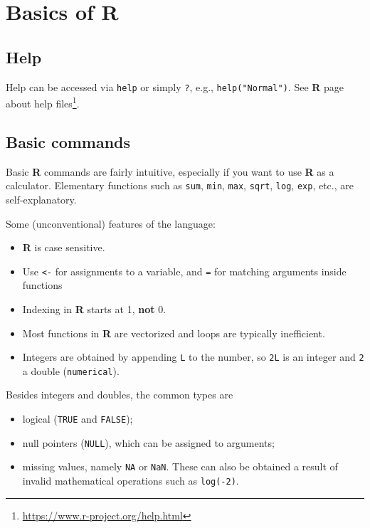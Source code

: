 \documentclass[
  11pt,
  letterpaper,
]{book}
\providecommand{\tightlist}{%
  \setlength{\itemsep}{0pt}\setlength{\parskip}{0pt}}
\renewcommand{\href}[2]{#2\footnote{\url{#1}}}
\theoremstyle{definition}
\theoremstyle{definition}
\theoremstyle{definition}
\theoremstyle{definition}
\theoremstyle{remark}
\begin{document}
\hypertarget{basics-of-r}{%
\section{\texorpdfstring{Basics of \textbf{R}}{Basics of R}}\label{basics-of-r}}

\hypertarget{help}{%
\subsection*{Help}\label{help}}

Help can be accessed via \texttt{help} or simply \texttt{?}, e.g., \texttt{help("Normal")}. \href{https://www.r-project.org/help.html}{See \textbf{R} page about help files}.

\hypertarget{basic-commands}{%
\subsection*{Basic commands}\label{basic-commands}}

Basic \textbf{R} commands are fairly intuitive, especially if you want to use \textbf{R} as a calculator.
Elementary functions such as \texttt{sum}, \texttt{min}, \texttt{max}, \texttt{sqrt}, \texttt{log}, \texttt{exp}, etc., are self-explanatory.

Some (unconventional) features of the language:

\begin{itemize}
\tightlist
\item
  \textbf{R} is case sensitive.
\item
  Use \texttt{\textless{}-} for assignments to a variable, and \texttt{=} for matching arguments inside functions
\item
  Indexing in \textbf{R} starts at 1, \textbf{not} 0.
\item
  Most functions in \textbf{R} are vectorized and loops are typically inefficient.
\item
  Integers are obtained by appending \texttt{L} to the number, so \texttt{2L} is an integer and \texttt{2} a double (\texttt{numerical}).
\end{itemize}

Besides integers and doubles, the common types are

\begin{itemize}
\tightlist
\item
  logical (\texttt{TRUE} and \texttt{FALSE});
\item
  null pointers (\texttt{NULL}), which can be assigned to arguments;
\item
  missing values, namely \texttt{NA} or \texttt{NaN}. These can also be obtained a result of invalid mathematical operations such as \texttt{log(-2)}.
\end{itemize}
\end{document}
